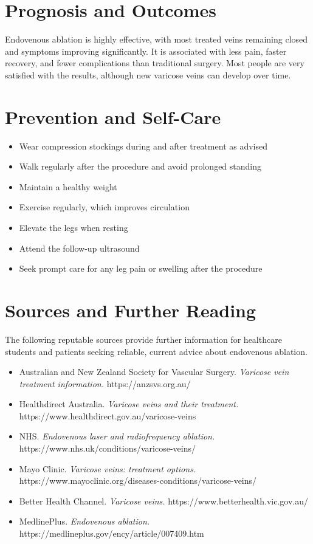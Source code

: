 \section*{Prognosis and Outcomes}
Endovenous ablation is highly effective, with most treated veins remaining closed and symptoms improving significantly. It is associated with less pain, faster recovery, and fewer complications than traditional surgery. Most people are very satisfied with the results, although new varicose veins can develop over time.

\section*{Prevention and Self-Care}
\begin{itemize}
    \item Wear compression stockings during and after treatment as advised
    \item Walk regularly after the procedure and avoid prolonged standing
    \item Maintain a healthy weight
    \item Exercise regularly, which improves circulation
    \item Elevate the legs when resting
    \item Attend the follow-up ultrasound
    \item Seek prompt care for any leg pain or swelling after the procedure
\end{itemize}

\section*{Sources and Further Reading}
The following reputable sources provide further information for healthcare students and patients seeking reliable, current advice about endovenous ablation.
\begin{itemize}
    \item Australian and New Zealand Society for Vascular Surgery. \textit{Varicose vein treatment information.} https://anzsvs.org.au/
    \item Healthdirect Australia. \textit{Varicose veins and their treatment.} https://www.healthdirect.gov.au/varicose-veins
    \item NHS. \textit{Endovenous laser and radiofrequency ablation.} https://www.nhs.uk/conditions/varicose-veins/
    \item Mayo Clinic. \textit{Varicose veins: treatment options.} https://www.mayoclinic.org/diseases-conditions/varicose-veins/
    \item Better Health Channel. \textit{Varicose veins.} https://www.betterhealth.vic.gov.au/
    \item MedlinePlus. \textit{Endovenous ablation.} https://medlineplus.gov/ency/article/007409.htm
\end{itemize}

